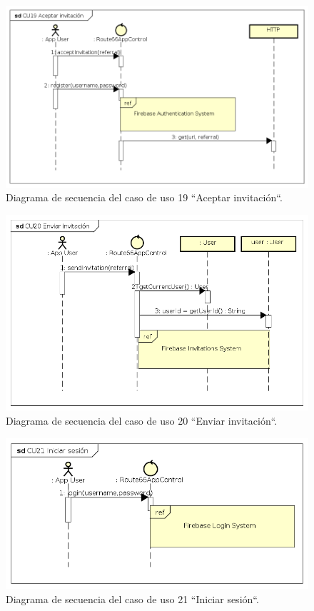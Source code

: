 \documentclass[twoside]{report}
\begin{document}
\begin{figure}[H]
\begin{center}
\includegraphics[scale=0.65]{images/sequence/CU19}
\caption{Diagrama de secuencia del caso de uso 19 “Aceptar invitación“.}
\end{center}
\end{figure}

\begin{figure}[H]
\begin{center}
\includegraphics[scale=0.65]{images/sequence/CU20}
\caption{Diagrama de secuencia del caso de uso  20 “Enviar invitación“.}
\end{center}
\end{figure}

\begin{figure}[H]
\begin{center}
\includegraphics[scale=0.7]{images/sequence/CU21}
\caption{Diagrama de secuencia del caso de uso  21 “Iniciar sesión“.}
\end{center}
\end{figure}
\end{document}
